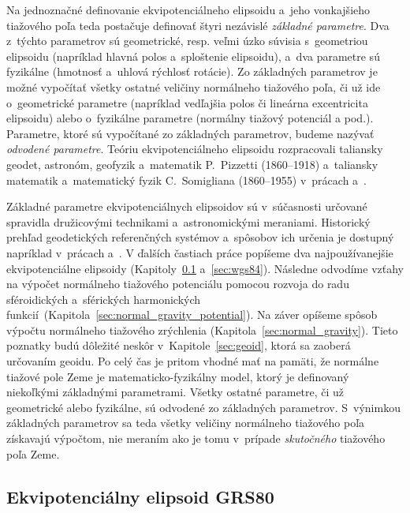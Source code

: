 \documentclass[a4paper, 12pt]{book}
\begin{document}
Na jednoznačné definovanie ekvipotenciálneho elipsoidu a~jeho vonkajšieho 
tiažového poľa teda postačuje definovať štyri nezávislé \emph{základné 
parametre}.  Dva z~týchto parametrov sú geometrické, resp. veľmi úzko súvisia 
s~geometriou elipsoidu (napríklad hlavná polos a~sploštenie elipsoidu), a~dva 
parametre sú fyzikálne (hmotnosť a~uhlová rýchlosť rotácie).  Zo základných 
parametrov je možné vypočítať všetky ostatné veličiny normálneho tiažového 
poľa, či už ide o~geometrické parametre (napríklad vedľajšia polos či lineárna 
excentricita elipsoidu) alebo o~fyzikálne parametre (normálny tiažový potenciál 
a pod.).  Parametre, ktoré sú vypočítané zo základných parametrov, budeme 
nazývať \emph{odvodené parametre}.  Teóriu ekvipotenciálneho elipsoidu 
rozpracovali taliansky geodet, astronóm, geofyzik a~matematik P.~Pizzetti 
(1860--1918) a~taliansky matematik a~matematický fyzik C.~Somigliana 
(1860--1955) v~prácach \textcite{Pizzetti1984} a~\textcite{Somigliana1929}.

Základné parametre ekvipotenciálnych elipsoidov sú v~súčasnosti určované 
spravidla družicovými technikami a~astronomickými meraniami.  Historický 
prehľad geodetických referenčných systémov a~spôsobov ich určenia je dostupný 
napríklad v~prácach \textcite{TorgeGeodesy} a~\textcite{MoritzPhysicalGeodesy}.  
V ďalších častiach práce popíšeme dva najpoužívanejšie ekvipotenciálne 
elipsoidy (Kapitoly~\ref{sec:grs80} a~\ref{sec:wgs84}).  Následne odvodíme 
vzťahy na výpočet normálneho tiažového potenciálu pomocou rozvoja do radu 
sféroidických a~sférických harmonických 
funkcií~(Kapitola~\ref{sec:normal_gravity_potential}).  Na záver opíšeme spôsob 
výpočtu normálneho tiažového zrýchlenia (Kapitola~\ref{sec:normal_gravity}).  
Tieto poznatky budú dôležité neskôr v~Kapitole~\ref{sec:geoid}, ktorá sa 
zaoberá určovaním geoidu.  Po celý čas je pritom vhodné mať na pamäti, že 
normálne tiažové pole Zeme je matematicko-fyzikálny model, ktorý je definovaný 
niekoľkými základnými parametrami.  Všetky ostatné parametre, či už geometrické 
alebo fyzikálne, sú odvodené zo základných parametrov.  S~výnimkou základných 
parametrov sa teda všetky veličiny normálneho tiažového poľa získavajú 
výpočtom, nie meraním ako je tomu v~prípade \emph{skutočného} tiažového poľa 
Zeme.





\subsection{Ekvipotenciálny elipsoid GRS80}
\label{sec:grs80}
\end{document}
